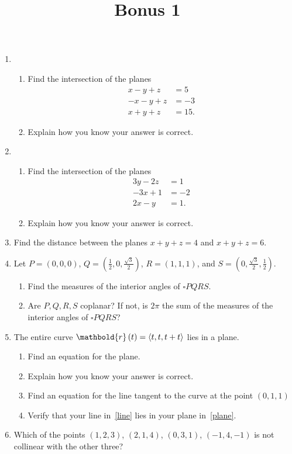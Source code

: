 \documentclass[12pt]{article}
\title{Bonus 1}
\author{}\date{}
\let\sin\relax\DeclareMathOperator{\sin}{\mathsf{sin}}
\let\cos\relax\DeclareMathOperator{\cos}{\mathsf{cos}}
\begin{document}
\maketitle
\thispagestyle{empty}

\begin{enumerate}

\item
\begin{enumerate}
\item Find the intersection of the planes
\begin{align*}
x-y+z&=5\\
-x-y+z&=-3\\
x+y+z&=15.
\end{align*}
\item Explain how you know your answer is correct.
\end{enumerate}

\item
\begin{enumerate}
\item Find the intersection of the planes
\begin{align*}
3y-2z&=1\\
-3x+1&=-2\\
2x-y&=1.
\end{align*}
\item Explain how you know your answer is correct.
\end{enumerate}

\item Find the distance between the planes
$x+y+z=4$ and $x+y+z=6$.

\item Let $P=\left(0,0,0\right)$,
$Q=\left(\frac{1}{2},0,\frac{\sqrt{3}}{2}\right)$,
$R=\left(1,1,1\right)$, and
$S=\left(0,\frac{\sqrt{3}}{2},\frac{1}{2}\right)$.
\begin{enumerate}
\item Find the measures of the interior angles
of $\square PQRS$.
\item Are $P,Q,R,S$ coplanar? If not, is $2\pi$ the
sum of the measures of the interior angles of
$\square PQRS$?
\end{enumerate}

\item
The entire curve $\mathbold{r}\left(t\right)
=\left\langle\cos{t},\sin{t},\cos{t}+\sin{t}\right\rangle$
lies in a plane.
\begin{enumerate}
\item\label{plane} Find an equation for the plane.
\item Explain how you know your answer is correct.
\item\label{line} Find an equation for the line tangent to the curve
at the point $\left(0,1,1\right)$
\item Verify that your line in~\autoref{line} lies in your plane
in~\autoref{plane}.
\end{enumerate}

\item Which of the points
$\left(1,2,3\right)$, $\left(2,1,4\right)$,
$\left(0,3,1\right)$, $\left(-1,4,-1\right)$
is not collinear with the other three?
\end{enumerate}
\end{document}
